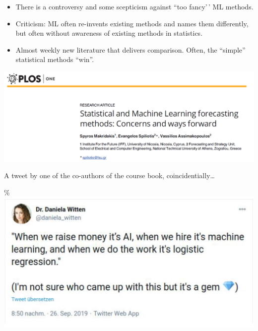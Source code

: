 \documentclass[
  ignorenonframetext,
]{beamer}
\begin{document}
\begin{frame}
\begin{itemize}
\item
  There is a controversy and some scepticism against ``too fancy'\,' ML
  methods.
\item
  Criticism: ML often re-invents existing methods and names them
  differently, but often without awareness of existing methods in
  statistics.
\item
  Almost weekly new literature that delivers comparison. Often, the
  ``simple'' statistical methods ``win''.
\end{itemize}

\includegraphics{ML_vs_stat.png}
\end{frame}

\begin{frame}
A tweet by one of the co-authors of the course book,
coincidentially\ldots{}

\%\includegraphics{AI_ML_stat.png}
\end{frame}
\end{document}
